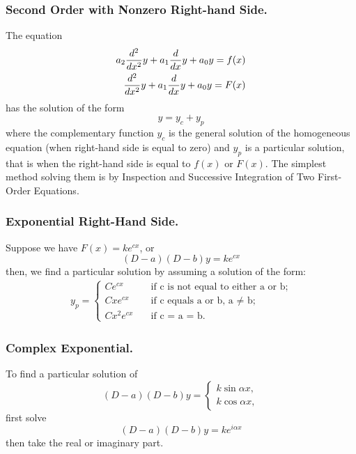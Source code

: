 \documentclass[../../../main.tex]{subfiles}
\begin{document}
\subsubsection{Second Order with Nonzero Right-hand Side.} The equation
\begin{align*}
    a_2\frac{d^2}{dx^2} y+a_1\frac{d}{dx} y+a_0y=f(x) \\
    \frac{d^2}{dx^2} y+a_1\frac{d}{dx} y+a_0y=F(x)
\end{align*}
has the solution of the form
\begin{equation*}
    y = y_c + y_p
\end{equation*}
where the complementary function $y_c$ is the general solution of the homogeneous
equation (when right-hand side is equal to zero) and $y_p$ is a particular solution, that is when the right-hand side is equal to $f(x)$ or $F(x)$.
 The simplest method solving them is by Inspection and Successive Integration of Two First-Order Equations.

\subsubsection{Exponential Right-Hand Side.}
Suppose we have $F (x) = ke^{cx}$, or
\begin{equation*}
    (D - a)(D - b)y =ke^{cx}
\end{equation*}
then, we find a particular solution by
assuming a solution of the form:
\begin{align*}
    y_p=
    \begin{cases}
        Ce^{cx} \quad    & \text{if c is not equal to either a or b;} \\
        Cxe^{cx} \quad   & \text{if c equals a or b, a  $\neq$ b;}    \\
        Cx^2e^{cx} \quad & \text{if c = a = b.}
    \end{cases}
\end{align*}

\subsubsection{Complex Exponential.} To find a particular solution of
\begin{equation*}
    (D - a)(D - b)y=\begin{cases}
        k\sin \alpha x, \\
        k\cos \alpha x,
    \end{cases}
\end{equation*}
first solve
\begin{equation*}
    (D - a)(D - b)y=ke^{i\alpha x}
\end{equation*}
then take the real or imaginary part.
\end{document}
